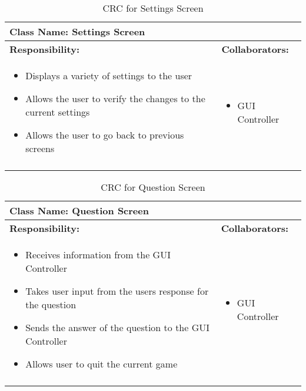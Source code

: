 \documentclass[titlepage]{article}
\begin{document}
	\begin{longtable}{| p{} | p{} |}
			\hline
			 \multicolumn{2}{|l|}{\textbf{Class Name: Settings Screen}} \\
			\hline
			\textbf{Responsibility:} & \textbf{Collaborators:} \\
			\hline
				\begin{itemize}
					\item Displays a variety of settings to the user
					\item Allows the user to verify the changes to the current settings
					\item Allows the user to go back to previous screens
				\end{itemize} & 
				\begin{itemize}
					\item GUI Controller
				\end{itemize} 
				\\
			\hline
		\caption{CRC for Settings Screen}
	\end{longtable}
	
	\begin{longtable}{| p{} | p{} |}
			\hline
			 \multicolumn{2}{|l|}{\textbf{Class Name: Question Screen}} \\
			\hline
			\textbf{Responsibility:} & \textbf{Collaborators:} \\
			\hline
				\begin{itemize}
					\item Receives information from the GUI Controller
					\item Takes user input from the users response for the question
					\item Sends the answer of the question to the GUI Controller
					\item Allows user to quit the current game
				\end{itemize} & 
				\begin{itemize}
					\item GUI Controller
				\end{itemize} 
				\\
			\hline
		\caption{CRC for Question Screen}
	\end{longtable}	
	
\end{document}
